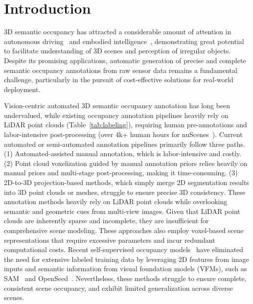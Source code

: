 \section{Introduction}
\label{sec:intro}
3D semantic occupancy has attracted a considerable amount of attention in autonomous driving~\cite{wang2021learning, tong2023scene, wang2024panoocc} and embodied intelligence~\cite{ramakrishnan2020occupancy, ramakrishnan2021exploration, chaplot2021seal}, demonstrating great potential to facilitate understanding of 3D scenes and perception of irregular objects. Despite its promising applications, automatic generation of precise and complete semantic occupancy annotations from raw sensor data remains a fundamental challenge, particularly in the pursuit of cost-effective solutions for real-world deployment.

Vision-centric automated 3D semantic occupancy annotation has long been undervalued, while existing occupancy annotation pipelines heavily rely on LiDAR point clouds (Table~\ref{tab:labeling}), requiring human pre-annotations and labor-intensive post-processing (over 4k+ human hours for nuScenes~\cite{tong2023scene}).
%
Current automated or semi-automated annotation pipelines primarily follow three paths. 
(1) Automated-assisted manual annotation, which is labor-intensive and costly. 
(2) Point cloud voxelization guided by manual annotation priors relies heavily on manual priors and multi-stage post-processing, making it time-consuming. 
(3) 2D-to-3D projection-based methods, which simply merge 2D segmentation results into 3D point clouds or meshes, struggle to ensure precise 3D consistency.
%
These annotation methods heavily rely on LiDAR point clouds while overlooking semantic and geometric cues from multi-view images. Given that LiDAR point clouds are inherently sparse and incomplete, they are insufficient for comprehensive scene modeling.
%
These approaches also employ voxel-based scene representations that require excessive parameters and incur redundant computational costs.
%
Recent self-supervised occupancy models~\cite{huang2024selfocc, gan2024comprehensive, zhang2023occnerf, boeder2024occflownet, wan2024gaussianocc} have eliminated the need for extensive labeled training data by leveraging 2D features from image inputs and semantic information from visual foundation models (VFMs), such as SAM~\cite{kirillov2023segment} and OpenSeed~\cite{zhang2023simple}. Nevertheless, these methods struggle to ensure complete, consistent scene occupancy, and exhibit limited generalization across diverse scenes. 

